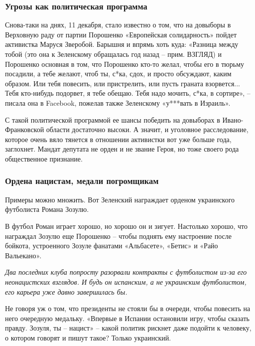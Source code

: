 \subsubsection{Угрозы как политическая программа}

Снова-таки на днях, 11 декабря, стало известно о том, что на довыборы в
Верховную раду от партии Порошенко «Европейская солидарность» пойдет активистка
Маруся Зверобой. Барышня и впрямь хоть куда: «Разница между тобой (это она к
Зеленскому обращалась год назад – прим. ВЗГЛЯД) и Порошенко основная в том, что
Порошенко кто-то желал, чтобы его в тюрьму посадили, а тебе желают, чтоб ты,
с*ка, сдох, и просто обсуждают, каким образом. Или тебя повесить, или
пристрелить, или пусть граната взорвется... Тебя кто-нибудь подорвет, я тебе
обещаю. Тебя надо мочить, с*ка, в сортире», – писала она в Facebook, пожелав
также Зеленскому «у***вать в Израиль».  

С такой политической программой ее шансы победить на довыборах в
Ивано-Франковской области достаточно высоки. А значит, и уголовное
расследование, которое очень вяло тянется в отношении активистки вот уже больше
года, заглохнет. Мандат депутата не орден и не звание Героя, но тоже своего
рода общественное признание.  

\subsubsection{Ордена нацистам, медали погромщикам}

Примеры можно множить. Вот Зеленский награждает орденом украинского футболиста
Романа Зозулю.

В футбол Роман играет хорошо, но хорошо он и зигует. Настолько хорошо, что
награждал Зозулю еще Порошенко – чтобы поднять ему настроение после бойкота,
устроенного Зозуле фанатами «Альбасете», «Бетис» и «Райо Вальекано». 

\begin{leftbar}
	\begingroup
		\em\large Два последних клуба попросту разорвали контракты с футболистом из-за
				его неонацистских взглядов. И будь он испанским, а не украинским
				футболистом, его карьера уже давно завершилась бы. 
	\endgroup
\end{leftbar}

Не говоря уж о том, что президенты не стояли бы в очереди, чтобы повесить на
него очередную медальку. «Впервые в Испании остановили игру, чтобы сказать
правду. Зозуля, ты – нацист» – какой политик рискнет даже подойти к человеку, о
котором говорят и пишут такое? Только украинский.

